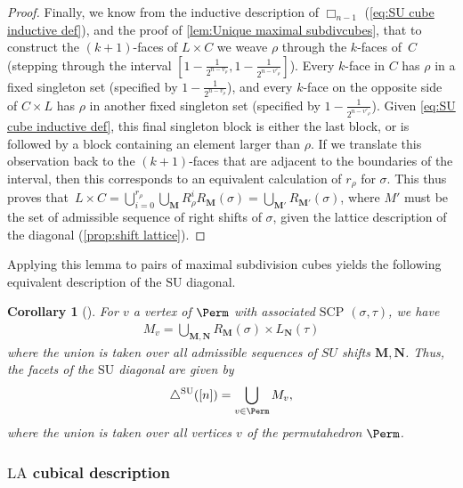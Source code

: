 \documentclass{amsart}
\newtheorem{corollary}[theorem]{Corollary}
\theoremstyle{definition}
\newcommand{\SU}{\mathrm{SU}}
\newcommand{\LA}{\mathrm{LA}}
\newcommand{\SUD}{\triangle^{\mathrm{SU}}}
\newcommand{\SCP}{\mathrm{SCP}}
\newcommand{\divcube}[1]{\Box_{#1}}
\newcommand{\maxsubdivpairsv}{M_v}
\begin{document}
\begin{proof}
Finally, we know from the inductive description of $\divcube{n-1}$ (\cref{eq:SU cube inductive def}), and the proof of \cref{lem:Unique maximal subdivcubes}, that to construct the $(k+1)$-faces of $L\times C$ we weave $\rho$ through the $k$-faces of~$C$ (stepping through the interval $[1-\frac{1}{2^{n-v_\rho}},1-\frac{1}{2^{n-v'_\rho}}]$).
Every $k$-face in $C$ has $\rho$ in a fixed singleton set (specified by $1-\frac{1}{2^{n-v_\rho}}$), and every $k$-face on the opposite side of $C\times L$ has $\rho$ in another fixed singleton set (specified by $1-\frac{1}{2^{n-v'_\rho}}$).
Given \cref{eq:SU cube inductive def}, this final singleton block is either the last block, or is followed by a block containing an element larger than $\rho$.
If we translate this observation back to the $(k+1)$-faces that are adjacent to the boundaries of the interval, then this corresponds to an equivalent calculation of $r_\rho$ for $\sigma$.
This thus proves that~${L\times C = \bigcup_{i=0}^{r_\rho}\bigcup_{\mathbf{M}}R^i_\rho R_\mathbf{M}(\sigma) = \bigcup_{\mathbf{M'}}R_\mathbf{M'}(\sigma)}$, where $M'$ must be the set of admissible sequence of right shifts of $\sigma$, given the lattice description of the diagonal (\cref{prop:shift lattice}).
\end{proof}

Applying this lemma to pairs of maximal subdivision cubes yields the following equivalent description of the $\SU$ diagonal.

\begin{corollary}[{\cite[Form.~(1)~\&~(3)]{SaneblidzeUmble-comparingDiagonals}}]
\label{prop:SU-cubical}
For $v$ a vertex of $\Perm$ with associated $\SCP$ $(\sigma,\tau)$, we have
\begin{align*}
\maxsubdivpairsv = \bigcup_{\mathbf{M},\mathbf{N}} R_\mathbf{M}(\sigma) \times L_{\mathbf{N}}(\tau)
\end{align*}
where the union is taken over all admissible sequences of $SU$ shifts $\mathbf{M},\mathbf{N}$.
Thus, the facets of the $\SU$ diagonal are given by
\begin{align*}
\SUD([n]) = \bigcup_{v \in \Perm} \maxsubdivpairsv,
\end{align*}
where the union is taken over all vertices $v$ of the permutahedron $\Perm$. 
\end{corollary}

\subsubsection{$\LA$ cubical description}
\end{document}
